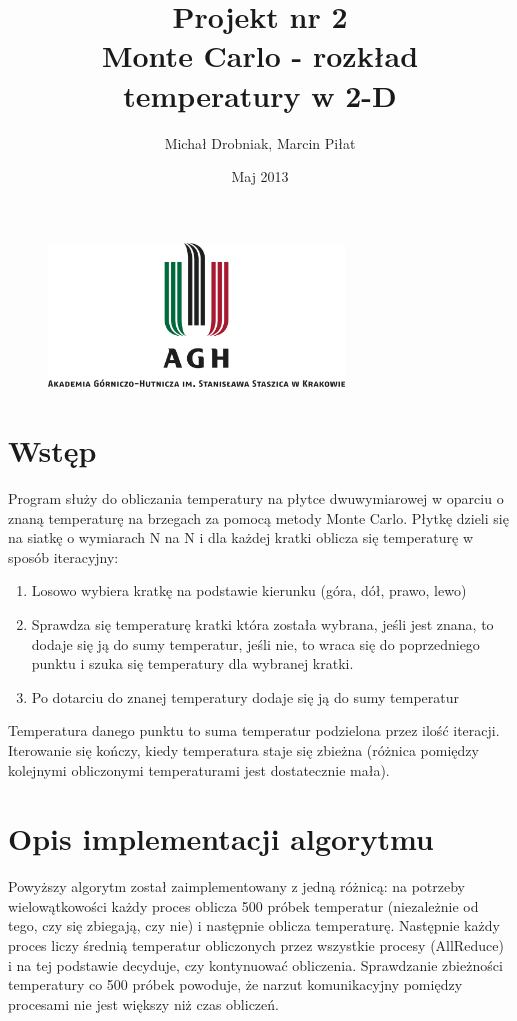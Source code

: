 \documentclass[11pt,a4paper]{article}
\begin{document}
\title{\LARGE  Projekt nr 2 \\ \vspace{0.4cm} \textbf{Monte Carlo - rozkład temperatury w 2-D}}
\author{Michał Drobniak, 
 Marcin Piłat }
\date{Maj 2013}
\maketitle

\vfill
\begin{figure}[H]
\begin{center}
\includegraphics[width=0.7\textwidth]{agh_nzw_s_pl_1w_wbr_rgb_150ppi.jpg}
\end{center}
\end{figure}
\newpage

\section{Wstęp}
Program służy do obliczania temperatury na płytce dwuwymiarowej w oparciu o znaną temperaturę na brzegach za pomocą metody Monte Carlo. Płytkę dzieli się na siatkę o wymiarach N na N i dla każdej kratki oblicza się temperaturę w sposób iteracyjny:
\begin{enumerate}
\item Losowo wybiera kratkę na podstawie kierunku (góra, dół, prawo, lewo)
\item Sprawdza się temperaturę kratki która została wybrana, jeśli jest znana, to dodaje się ją do sumy temperatur, jeśli nie, to wraca się do poprzedniego punktu i szuka się temperatury dla wybranej kratki.
\item Po dotarciu do znanej temperatury dodaje się ją do sumy temperatur
\end{enumerate}
Temperatura danego punktu to suma temperatur podzielona przez ilość iteracji. Iterowanie się kończy, kiedy temperatura staje się zbieżna (różnica pomiędzy kolejnymi obliczonymi temperaturami jest dostatecznie mała).

\section{Opis implementacji algorytmu}
Powyższy algorytm został zaimplementowany z jedną różnicą: na potrzeby wielowątkowości każdy proces oblicza 500 próbek temperatur (niezależnie od tego, czy się zbiegają, czy nie) i następnie oblicza temperaturę. Następnie każdy proces liczy średnią temperatur obliczonych przez wszystkie procesy (AllReduce) i na tej podstawie decyduje, czy kontynuować obliczenia. Sprawdzanie zbieżności temperatury co 500 próbek powoduje, że narzut komunikacyjny pomiędzy procesami nie jest większy niż czas obliczeń.
\end{document}
